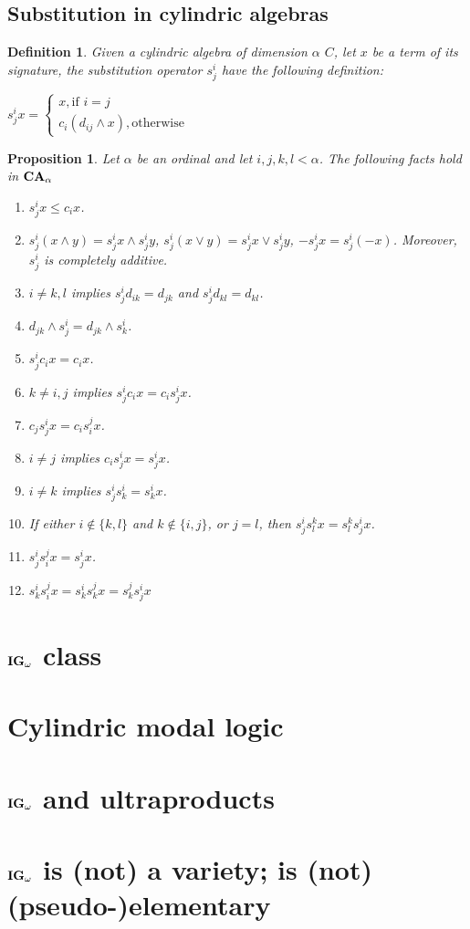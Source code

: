 \documentclass[a4paper]{article}
\theoremstyle{defin}
\newtheorem{defin}{Definition}
\theoremstyle{theorem}
\theoremstyle{prop}
\newtheorem{prop}{Proposition}
\theoremstyle{lemma}
\theoremstyle{ex}
\theoremstyle{col}
\begin{document}
\subsection{Substitution in cylindric algebras}

\begin{defin}
  Given a cylindric algebra of dimension $\alpha$ $C$, let $x$ be a term of its signature, the substitution operator $s^{i}_{j}$ have the following definition:
  \begin{center}
  $s^{i}_{j} x = \begin{cases} x, \text{if } i = j \\ c_i (d_{ij} \land x), \text{otherwise} \end{cases}$
  \end{center}
\end{defin}

\begin{prop} Let $\alpha$ be an ordinal and let $i, j, k, l < \alpha$. The following facts hold in ${\bf CA}_{\alpha}$

  \begin{enumerate}
    \item $s^{i}_j x \leq c_i x$.
    \item $s^{i}_j (x \land y) = s^{i}_j x \land s^{i}_j y$, $s^{i}_j (x \lor y) = s^{i}_j x \lor s^{i}_j y$, $- s^{i}_j x = s^{i}_j (- x)$.
    Moreover, $s^{i}_j$ is completely additive.
    \item $i \neq k, l$ implies $s^i_j d_{ik} = d_{jk}$ and $s^i_j d_{kl} = d_{kl}$.
    \item $d_{jk} \land s^{i}_j = d_{jk} \land s^{i}_k$.
    \item $s^i_j c_i x = c_i x$.
    \item $k \neq i,j$ implies $s^i_j c_i x = c_i s^i_j x$.
    \item $c_j s^i_j x = c_i s^j_i x$.
    \item $i \neq j$ implies $c_i s^i_j x = s^i_j x$.
    \item $i \neq k$ implies $s^i_j s^i_k = s^i_k x$.
    \item If either $i \notin \{ k, l\}$ and $k \notin \{ i, j\}$, or $j = l$, then $s^i_j s^k_l x = s^k_l s^i_j x$.
    \item $s^i_j s^j_i x = s^i_j x$.
    \item $s^i_k s^j_i x = s^i_k s^j_k x = s^j_k s^i_j x$
  \end{enumerate}
\end{prop}

\section{${\bf IG}_{\omega}$ class}

\section{Cylindric modal logic}

\section{${\bf IG}_{\omega}$ and ultraproducts}

\section{${\bf IG}_{\omega}$ is (not) a variety; is (not) (pseudo-)elementary}



\end{document}
